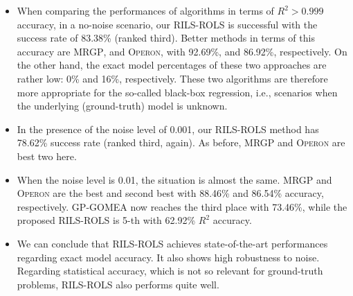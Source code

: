\documentclass{bmcart}
\begin{document}
\begin{itemize}
	\item When comparing the performances of algorithms in terms of $R^2 > 0.999$ accuracy, in a no-noise scenario, our \textsc{RILS}-\textsc{ROLS} is successful with the success rate of 83.38\% (ranked third). Better methods in terms of this accuracy are \textsc{MRGP}, and \textsc{Operon}, with 92.69\%, and 86.92\%, respectively. On the other hand, the exact model percentages of these two approaches are rather low: 0\% and 16\%, respectively. These two algorithms are therefore more appropriate for the so-called black-box regression, i.e., scenarios when the underlying (ground-truth) model is unknown. 
	
	\item  In the presence of the noise level of 0.001, our \textsc{RILS-ROLS} method has 78.62\% success rate (ranked third, again).  As before, \textsc{MRGP} and \textsc{Operon} are best two here. 
	
	\item   When the noise level is 0.01, the situation is almost the same. \textsc{MRGP} and \textsc{Operon} are the best and second best with 88.46\% and 86.54\% accuracy, respectively. \textsc{GP-GOMEA} now reaches the third place with 73.46\%, while the proposed \textsc{RILS-ROLS} is 5-th with 62.92\% $R^2$ accuracy.
	
	\item We can conclude that \textsc{RILS}-\textsc{ROLS} achieves state-of-the-art performances regarding exact model accuracy. It also shows high robustness to noise. Regarding statistical accuracy, which is not so relevant for ground-truth problems, \textsc{RILS}-\textsc{ROLS} also performs quite well. 
	
\end{itemize}
\end{document}
